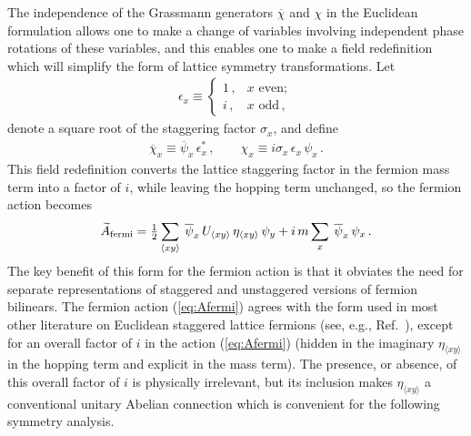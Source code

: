 \documentclass [12pt]{article}
\begin{document}
The independence of the Grassmann generators
$\overline\chi$ and $\chi$ in the Euclidean formulation
allows one to make a change of variables involving
independent phase rotations of these variables, and this
enables one to make a field redefinition which will 
simplify the form of lattice symmetry transformations.
Let
\begin{align}
    \epsilon_x \equiv
    \begin{cases}
	1 \,, & x \mbox { even}; \\
	i \,, & x \mbox{ odd}\,,
    \end{cases}
\end{align}
denote a square root of the staggering factor $\sigma_x$,
and define
\begin{align}
    \overline\chi_x \equiv \overline\psi_x \, \epsilon_x^* \,,
    \qquad
    \chi_x \equiv i \sigma_x \, \epsilon_x \, \psi_x \,.
\label{eq:redef}
\end{align}
This field redefinition converts the lattice staggering factor in the
fermion mass term into a factor of $i$, while leaving the hopping term unchanged,
so the fermion action becomes
\begin{align}
    \widetilde A_{\rm fermi}
    =
    \tfrac 12 \sum_{\langle xy \rangle} \>
    \overline\psi_x \, U_{\langle xy \rangle} \,
    \eta_{\langle xy \rangle} \, \psi_y
    + i \, m \sum_x \> \overline\psi_x \, \psi_x \,.
\label{eq:Afermi}
\end{align}
The key benefit of this form for the fermion action
is that it obviates the
need for separate representations of staggered and
unstaggered versions of fermion bilinears.
The fermion action (\ref{eq:Afermi}) agrees with the form used
in most other literature on Euclidean staggered lattice fermions
(see, e.g., Ref.~\cite{Kronfeld:2007ek}),
except for an overall factor of $i$ in the action (\ref{eq:Afermi})
(hidden in the imaginary $\eta_{\langle xy \rangle}$ in
the hopping term and explicit in the mass term).
The presence, or absence, of this overall 
factor of $i$ is physically irrelevant, but its
inclusion makes $\eta_{\langle xy \rangle}$ a conventional
unitary Abelian connection which is convenient for the following symmetry analysis.
\end{document}
